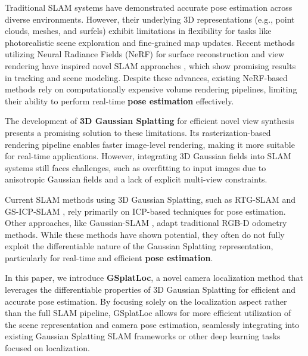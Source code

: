 \documentclass[twocolumn]{article}
\begin{document}
Traditional SLAM systems \autocite{kerlDenseVisualSLAM2013} have
demonstrated accurate pose estimation across diverse environments.
However, their underlying 3D representations (e.g., point clouds,
meshes, and surfels) exhibit
limitations\autocite{newcombeKinectfusionRealtimeDense2011,rusinkiewiczEfficientVariantsICP2001}
in flexibility for tasks like photorealistic scene exploration and
fine-grained map updates. Recent methods utilizing Neural Radiance
Fields (NeRF) \autocite{mildenhallNeRFRepresentingScenes2022} for
surface reconstruction and view rendering have inspired novel SLAM
approaches \autocite{sandstromPointslamDenseNeural2023}, which show
promising\autocite{sucarImapImplicitMapping2021,zhuNiceslamNeuralImplicit2022}
results in tracking and scene modeling. Despite these
advances\autocite{garbinFastnerfHighfidelityNeural2021}, existing
NeRF-based methods rely on computationally expensive volume rendering
pipelines, limiting their ability to perform real-time \textbf{pose
estimation} effectively.

The development of \textbf{3D Gaussian Splatting}
\autocite{kerbl3DGaussianSplatting2023} for efficient novel view
synthesis presents a promising solution to these limitations. Its
rasterization-based rendering pipeline enables faster image-level
rendering, making it more suitable for real-time applications. However,
integrating 3D Gaussian fields into SLAM systems still faces challenges,
such as overfitting to input images due to anisotropic Gaussian fields
and a lack of explicit multi-view constraints.

Current SLAM methods using 3D Gaussian Splatting, such as RTG-SLAM
\autocite{pengRTGSLAMRealtime3D2024} and GS-ICP-SLAM
\autocite{haRGBDGSICPSLAM2024}, rely primarily on ICP-based techniques
for pose estimation. Other approaches, like Gaussian-SLAM
\autocite{yugayGaussianSLAMPhotorealisticDense2024}, adapt traditional
RGB-D odometry methods. While these methods have shown potential, they
often do not fully exploit the differentiable nature of the Gaussian
Splatting representation, particularly for real-time and efficient
\textbf{pose estimation}.

In this paper, we introduce \textbf{GSplatLoc}, a novel camera
localization method that leverages the differentiable properties of 3D
Gaussian Splatting for efficient and accurate pose estimation. By
focusing solely on the localization aspect rather than the full SLAM
pipeline, GSplatLoc allows for more efficient utilization of the scene
representation and camera pose estimation, seamlessly integrating into
existing Gaussian Splatting SLAM frameworks or other deep learning tasks
focused on localization.
\end{document}
